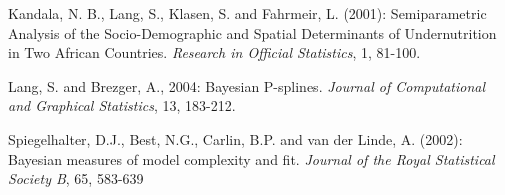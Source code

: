 \documentclass{article}
\begin{document}
\begin{thebibliography}{99}
 Kandala, N. B., Lang,
S., Klasen, S. and Fahrmeir, L. (2001): Semiparametric Analysis of
the Socio-Demographic and Spatial Determinants of Undernutrition
in Two African Countries. {\it Research in Official Statistics},
1, 81-100.

 Lang, S. and Brezger,
A., 2004: Bayesian P-splines. {\it Journal of Computational and
Graphical Statistics}, 13, 183-212.

 Spiegelhalter,
D.J., Best, N.G., Carlin, B.P. and van der Linde, A. (2002):
Bayesian measures of model complexity and fit. {\it Journal of the
Royal Statistical Society B}, 65, 583-639

\end{thebibliography}
\end{document}
